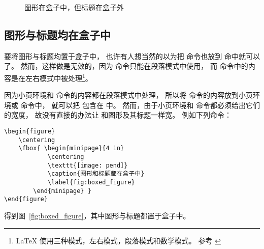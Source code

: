 \begin{figure}
	\centering
	\caption{图形在盒子中，但标题在盒子外}
	\label{fig:boxed_graphic}
\end{figure}

\subsection{图形与标题均在盒子中}

要将图形与标题均置于盒子中，
也许有人想当然的以为把  命令也放到  命中就可以了。
然而，这样做是无效的，因为  命令只能在段落模式中使用，
而  命令中的内容是在左右模式中被处理\footnote{
	\LaTeX{} 使用三种模式，左右模式，段落模式和数学模式。
	参考 \cite[第36页]{Lamport1994}}。

因为小页环境和  命令的内容都在段落模式中处理，
所以将  命令的内容放到小页环境或  命令中，
就可以把  包含在  中。
然而，由于小页环境和  命令都必须给出它们的宽度，
故没有直接的办法让  和图形及其标题一样宽。
例如下列命令：
\begin{lstlisting}
\begin{figure}
	\centering
	\fbox{ \begin{minipage}{4 in}
			\centering
			\texttt{[image: pend]}
			\caption{图形和标题都在盒子中}
			\label{fig:boxed_figure}
		\end{minipage} }
\end{figure}
\end{lstlisting}
得到图~\ref{fig:boxed_figure}，其中图形与标题都置于盒子中。

\begin{figure}
	\centering
	\end{figure}


